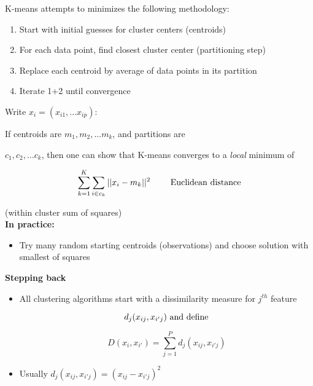 \documentclass{article}
\begin{document}
K-means attempts to minimizes the following methodology:

\begin{enumerate}
\item Start with initial guesses for cluster centers (centroids)

\item For each data point, find closest cluster center (partitioning step)

\item Replace each centroid by average of data points in its partition

\item Iterate 1+2 until convergence

\end{enumerate}

Write $x_i = (x_{i1}, ... x_{ip})$:

If centroids are $m_1, m_2, ... m_k$, and partitions are

$c_1, c_2, ... c_k$, then one can show that K-means converges to a {\it local} minimum of

\[
\sum^K_{k=1} \sum_{i\in c_k} || x_i - m_k ||^2 \ \ \ \ \ \ \ \rm Euclidean \ distance
\]

(within cluster sum of squares) \\

{\bf In practice:}

\begin{itemize}

\item Try many random starting centroids (observations) and choose solution with smallest of squares

\end{itemize}

{\bf Stepping back}

\begin{itemize}

\item All clustering algorithms start with a dissimilarity measure for $j^{th}$ feature

$$d_j (x_{ij} , x_{i' j}) \ \rm and\ define $$

$$D (x_i, x_{i'}) = \sum^P_{j=1} d_j (x_{ij}, x_{{i'}j} ) $$

\item[] Usually $d_j (x_{ij}, x_{i' j}) = (x_{ij} - x_{i'j})^2$

\end{itemize}
\end{document}
